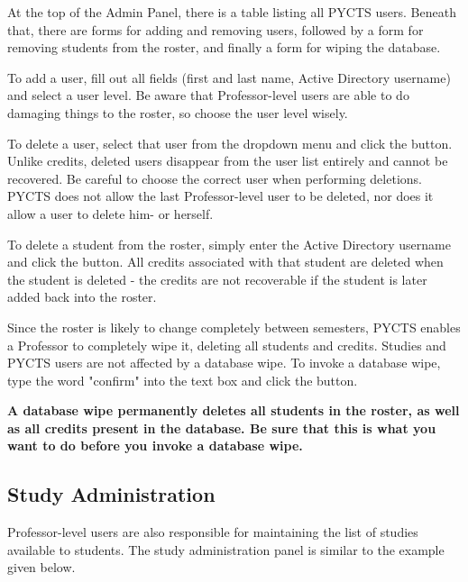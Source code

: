 \documentclass[letterpaper,titlepage]{article}
\begin{document}
At the top of the Admin Panel, there is a table listing all PYCTS users. Beneath that, there are forms for adding and removing users, followed by a form for removing students from the roster, and finally a form for wiping the database.

To add a user, fill out all fields (first and last name, Active Directory username) and select a user level. Be aware that Professor-level users are able to do damaging things to the roster, so choose the user level wisely.

To delete a user, select that user from the dropdown menu and click the button. Unlike credits, deleted users disappear from the user list entirely and cannot be recovered. Be careful to choose the correct user when performing deletions. PYCTS does not allow the last Professor-level user to be deleted, nor does it allow a user to delete him- or herself.

To delete a student from the roster, simply enter the Active Directory username and click the button. All credits associated with that student are deleted when the student is deleted - the credits are not recoverable if the student is later added back into the roster.

Since the roster is likely to change completely between semesters, PYCTS enables a Professor to completely wipe it, deleting all students and credits. Studies and PYCTS users are not affected by a database wipe. To invoke a database wipe, type the word "confirm" into the text box and click the button.

\textbf{A database wipe permanently deletes all students in the roster, as well as all credits present in the database. Be sure that this is what you want to do before you invoke a database wipe.}

\newpage
\subsection{Study Administration}
Professor-level users are also responsible for maintaining the list of studies available to students. The study administration panel is similar to the example given below.
\end{document}
